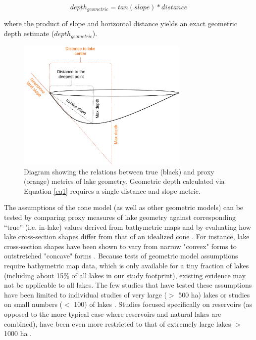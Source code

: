 \documentclass[draft]{agujournal2019}
\begin{document}
\begin{linenomath*}
\begin{equation}
      depth_{geometric} = tan(slope) * distance \label{eq1}
\end{equation}
\end{linenomath*}

\noindent
where the product of slope and horizontal distance yields an exact geometric depth estimate ($depth_{geometric}$).

\begin{figure}
\noindent\includegraphics[width=0.74\textwidth]{../figures/slope_diagram_new}
\caption{Diagram showing the relations between true (black) and proxy (orange) metrics of lake geometry. Geometric depth calculated via Equation \ref{eq1} requires a single distance and slope metric.}\label{fig1}
\end{figure}

The assumptions of the cone model (as well as other geometric models) can be tested by comparing proxy measures of lake geometry against corresponding “true” (i.e. in-lake) values derived from bathymetric maps and by evaluating how lake cross-section shapes differ from that of an idealized cone \cite{johanssonNewApproachesModelling2007}. For instance, lake cross-section shapes have been shown to vary from narrow "convex" forms to outstretched "concave" forms \cite{hakansonLakeFormLake1977}. Because tests of geometric model assumptions require bathymetric map data, which is only available for a tiny fraction of lakes (including about 15\% of all lakes in our study footprint), existing evidence may not be applicable to all lakes. The few studies that have tested these assumptions have been limited to individual studies of very large ($>$ 500 ha) lakes or studies on small numbers ($<$ 100) of lakes \cite{johanssonNewApproachesModelling2007}. Studies focused specifically on reservoirs (as opposed to the more typical case where reservoirs and natural lakes are combined), have been even more restricted to that of extremely large lakes $>$ 1000 ha \cite{lehnerHighresolutionMappingWorld2011, messagerEstimatingVolumeAge2016}.
\end{document}
